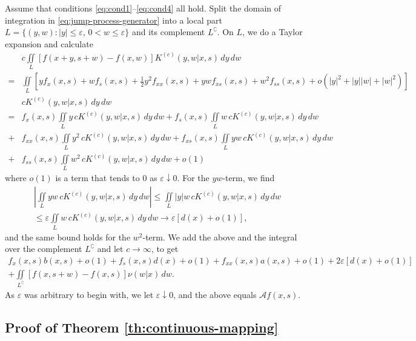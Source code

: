 \documentclass[a4paper,12pt]{elsarticle}
\numberwithin{equation}{section}
\theoremstyle{plain}
\theoremstyle{definition}
\theoremstyle{remark}
\numberwithin{equation}{section}
\newcommand{\1}{\mathbf 1}
\begin{document}
Assume that conditions \eqref{eq:cond1}--\eqref{eq:cond4} all hold. 
Split the domain of integration in \eqref{eq:jump-process-generator} into a local part $L = \{(y,w): |y| \le \varepsilon, \, 0 < w \le \varepsilon\}$ and its complement $L^\complement$. On $L$, we do a Taylor expansion and calculate
\begin{align*}
&c \iint\limits_L [f(x+y, s+w) - f(x,w)] K^{(c)}(y,w|x,s)\,dy\,dw
\\
= &\iint\limits_L \left[y f_x(x,s)
+ w f_s(x,s)
+ \frac{1}{2} y^2 f_{xx}(x,s) 
+ yw f_{xs}(x,s) 
+ w^2 f_{ss}(x,s)
+ o(|y|^2 + |y||w| + |w|^2)\right]
\\
& c K^{(c)}(y,w | x,s) \,dy\,dw
\\
= &f_x(x,s) \iint\limits_L y \,cK^{(c)}(y,w|x,s)\,dy\,dw
+ f_s(x,s) \iint\limits_L w \,cK^{(c)}(y,w|x,s)\,dy\,dw
\\
+ &f_{xx}(x,s) \iint\limits_L y^2 \,cK^{(c)}(y,w|x,s)\,dy\,dw
+ f_{xs}(x,s) \iint\limits_L yw \,cK^{(c)}(y,w|x,s)\,dy\,dw
\\
+ &f_{ss}(x,s) \iint\limits_L w^2 \,cK^{(c)}(y,w|x,s)\,dy\,dw
+ o(1)
\end{align*}
where $o(1)$ is a term that tends to $0$ as $\varepsilon \downarrow 0$. 
For the $yw$-term, we find 
\begin{align*}
\left|\iint\limits_L yw \,cK^{(c)}(y,w|x,s)\,dy\,dw \right|
\le \iint\limits_L |y|w \,cK^{(c)}(y,w|x,s)\,dy\,dw
\\
\le \varepsilon \iint\limits_L w \,cK^{(c)}(y,w|x,s)\,dy\,dw
\to \varepsilon [d(x) + o(1)],
\end{align*}
and the same bound holds for the $w^2$-term. 
We add the above and the integral over the complement $L^\complement$ and let $c \to \infty$, to get
\begin{align*}
f_x(x,s) b(x,s) + o(1) + f_s(x,s) d(x) + o(1) + f_{xx}(x,s) a(x,s) + o(1) 
+ 2\varepsilon [d(x) + o(1)]
\\
+ \iint\limits_{L^\complement} [f(x, s+w) - f(x,s)] \nu(w|x)\,dw.
\end{align*}
As $\varepsilon$ was arbitrary to begin with, we let $\varepsilon \downarrow 0$, 
and the above equals $\mathcal A f(x,s)$. 

\subsection{Proof of Theorem \ref{th:continuous-mapping}}
\label{sec:app-pf-th2}
\end{document}

